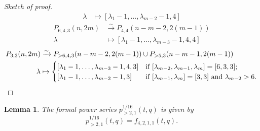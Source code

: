 \documentclass[a4paper, 12pt, reqno]{amsart}
\newtheorem{lemma}[theorem]{Lemma}
\theoremstyle{remark}
\numberwithin{equation}{subsection}
\begin{document}
\begin{proof}[Sketch of proof]
\begin{align*}
    \lambda &\mapsto [\lambda_1 - 1, \dots, \lambda_{m - 2} - 1, 4]
  \end{align*}
  \begin{align*}
    P_{6, 4, 3}(n, 2m) &\xrightarrow{\sim} P_{4, 4}(n - m - 2, 2(m - 1)) \\
    \lambda &\mapsto [\lambda_1 - 1, \dots, \lambda_{m - 3} - 1, 4, 4]
  \end{align*}
  \begin{align*}
    P_{3, 3}(n, 2m) &\xrightarrow{\sim} P_{>6, 4, 3}(n - m - 2, 2(m - 1)) \cup P_{>5, 3}(n - m - 1, 2(m - 1)) \\
    \lambda &\mapsto
              \begin{cases}
                [\lambda_1 - 1, \dots, \lambda_{m - 3} - 1, 4, 3] &\text{if }[\lambda_{m - 2}, \lambda_{m - 1}, \lambda_m] = [6, 3, 3]; \\
                [\lambda_1 - 1, \dots, \lambda_{m - 2} - 1, 3] &\text{if }[\lambda_{m - 1}, \lambda_m] = [3, 3]\text{ and }\lambda_{m - 2} > 6. \qedhere
              \end{cases}
  \end{align*}
\end{proof}

\begin{lemma}
  \label{lmm:33}
  The formal power series $p^{1/16}_{>2, 1}(t, q)$ is given by
  \begin{equation*}
    p^{1/16}_{>2, 1}(t, q) = f_{4, 2, 1, 1}(t, q).
  \end{equation*}
\end{lemma}
\end{document}
